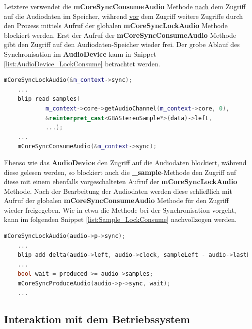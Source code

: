 \documentclass[11pt,a4paper]{scrartcl}
\begin{document}
Letztere verwendet die \textbf{mCoreSyncConsumeAudio} Methode \underline{nach} dem Zugriff auf die Audiodaten im Speicher, w\"ahrend \underline{vor} dem Zugriff weitere Zugriffe durch den Prozess mittels Aufruf der globalen \textbf{mCoreSyncLockAudio} Methode blockiert werden. Erst der Aufruf der \textbf{mCoreSyncConsumeAudio} Methode gibt den Zugriff auf den Audiodaten-Speicher wieder frei. Der grobe Ablauf des Synchronisation im \textbf{AudioDevice} kann in Snippet \ref{list:AudioDevice_LockConsume} betrachtet werden.

\vspace{5mm}
\begin{lstlisting}[language=C++, caption={AudioDevice - \enquote{Lock / Consume}}, label={list:AudioDevice_LockConsume}]
	mCoreSyncLockAudio(&m_context->sync);
	...
	blip_read_samples(
            m_context->core->getAudioChannel(m_context->core, 0),
            &reinterpret_cast<GBAStereoSample*>(data)->left,
            ...);
    ...
    mCoreSyncConsumeAudio(&m_context->sync);
\end{lstlisting}

Ebenso wie das \textbf{AudioDevice} den Zugriff auf die Audiodaten blockiert, w\"ahrend diese gelesen werden, so blockiert auch die \textbf{{\_}sample}-Methode den Zugriff auf diese mit einem ebenfalls vorgeschalteten Aufruf der \textbf{mCoreSyncLockAudio} Methode. Nach der Bearbeitung der Audiodaten werden diese schlie{\ss}lich mit Aufruf der globalen \textbf{mCoreSyncConsumeAudio} Methode f\"ur den Zugriff wieder freigegeben. Wie in etwa die Methode bei der Synchronisation vorgeht, kann im folgenden Snippet \ref{list:Sample_LockConsume} nachvollzogen werden.

\vspace{5mm}
\begin{lstlisting}[language=C++, caption={{\_}sample - \enquote{Lock / Consume}}, label={list:Sample_LockConsume}]
	mCoreSyncLockAudio(audio->p->sync);
    ...
    blip_add_delta(audio->left, audio->clock, sampleLeft - audio->lastLeft);
    ...	
	bool wait = produced >= audio->samples;
	mCoreSyncProduceAudio(audio->p->sync, wait);
	...
\end{lstlisting}



\newpage

\subsection{Interaktion mit dem Betriebssystem}
\end{document}

